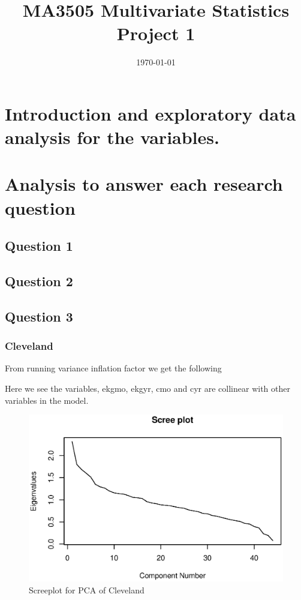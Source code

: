 \documentclass[a4paper]{article}
\title{MA3505 Multivariate Statistics Project 1}
\date{\today}
\begin{document}
\maketitle


\section{Introduction and exploratory data analysis for the variables.}


\section{Analysis to answer each research question}

\subsection{Question 1}


\subsection{Question 2}


\subsection{Question 3}

\subsubsection{Cleveland}

From running variance inflation factor we get the following



Here we see the variables, ekgmo, ekgyr, cmo and cyr are collinear with other variables in the model. 


\begin{figure}[H]
	\begin{center}
		\includegraphics[width=15cm]{question3output/clescreeplot.eps} 
	\end{center}
	\caption{Screeplot for PCA of Cleveland}
	\label{q3-cle-screeplot}
\end{figure}
\end{document}
